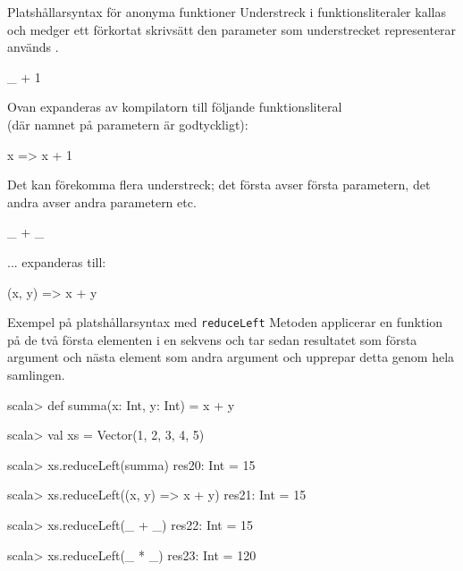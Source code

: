 \begin{Slide}{Platshållarsyntax för anonyma funktioner}\SlideFontSmall
	Understreck i funktionsliteraler kallas   och medger ett förkortat skrivsätt  den parameter som understrecket representerar används .
	\begin{Code}[basicstyle=\ttfamily\fontsize{10}{12}\selectfont]
		_ + 1
	\end{Code}
	Ovan expanderas av kompilatorn till följande funktionsliteral \\(där namnet på parametern är godtyckligt):
	\begin{Code}[basicstyle=\ttfamily\fontsize{10}{12}\selectfont]
		x => x + 1
	\end{Code}
	\pause
	Det kan förekomma flera understreck; det första avser första parametern, det andra avser andra parametern etc.
	\begin{Code}[basicstyle=\ttfamily\fontsize{10}{12}\selectfont]
		_ + _
	\end{Code}
	\pause
	... expanderas till:
	\begin{Code}[basicstyle=\ttfamily\fontsize{10}{12}\selectfont]
		(x, y) => x + y
	\end{Code}
\end{Slide}

\begin{Slide}{Exempel på platshållarsyntax med \texttt{reduceLeft}}\SlideFontSmall
	Metoden  applicerar en funktion på de två första elementen i en sekvens och tar sedan resultatet som första argument och nästa element som andra argument och upprepar detta genom hela samlingen.
	\begin{REPL}
		scala> def summa(x: Int, y: Int) = x + y

		scala> val xs = Vector(1, 2, 3, 4, 5)

		scala> xs.reduceLeft(summa)
		res20: Int = 15

		scala> xs.reduceLeft((x, y) => x + y)
		res21: Int = 15

		scala> xs.reduceLeft(_ + _)
		res22: Int = 15

		scala> xs.reduceLeft(_ * _)
		res23: Int = 120
	\end{REPL}
\end{Slide}


